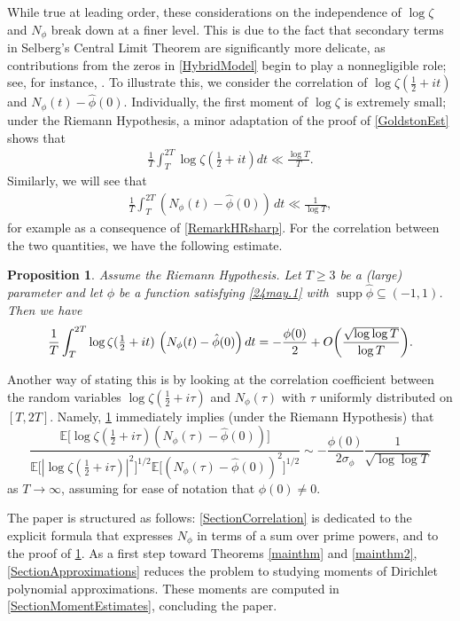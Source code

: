 \documentclass[12pt,oneside,english,a4paper]{amsart}
\newtheorem{prop}[thm]{Proposition}
\theoremstyle{remark}
\numberwithin{equation}{section}
\newcommand{\supp}{\operatorname{supp}}
\begin{document}
While true at leading order, these considerations on the independence of $\log\zeta$ and $N_\phi$ break down at a finer level. This is due to the fact that secondary terms in Selberg's Central Limit Theorem are significantly more delicate, as contributions from the zeros in \eqref{HybridModel} begin to play a nonnegligible role; see, for instance, \cite{Goldston1,LMQ,FG}.
To illustrate this, we consider the correlation of $\log\zeta(\frac12+it)$ and $N_\phi(t)-\hat\phi(0)$. Individually, the first moment of $\log\zeta$ is extremely small; under the Riemann Hypothesis, a minor adaptation of the proof of \eqref{GoldstonEst} shows that 
\begin{align*}
\frac{1}{T}\int_T^{2T} \log\zeta(\tfrac12+it)dt \ll \frac{\log T}{T}.
\end{align*}
Similarly, we will see that
\begin{align*} 
\frac{1}{T} \int_T^{2 T} \left (N_\phi(t) - \hat \phi(0) \right) \, dt \ll \frac{1}{\log T}, 
\end{align*}
for example as a consequence of \cref{RemarkHRsharp}.
For the correlation between the two quantities, we have the following estimate.

\begin{prop}\label{PropCorrelation}
    Assume the Riemann Hypothesis. Let $T \ge 3$ be a (large) parameter and let $\phi$ be a function satisfying \eqref{24may.1} with $\supp \hat\phi \subseteq (-1,1)$. Then we have
    \begin{equation}\notag
        \frac{1}{T}\int_{T}^{2T} \log \zeta(\tfrac{1}{2}+it) \, \left(N_\phi(t) - \hat\phi(0)\right) dt 
        = -\frac{\phi(0)}{2}+O\bigg(\frac{\sqrt{\log\log T}}{\log T}\bigg).
    \end{equation}
\end{prop}
Another way of stating this is by looking at the correlation coefficient between the random variables $\log \zeta(\tfrac{1}{2}+i \tau)$ and $N_\phi(\tau)$ with $\tau$ uniformly distributed on $[T,2T]$. Namely, \cref{PropCorrelation} immediately implies (under the Riemann Hypothesis) that
\[ \frac{\mathbb{E}\big[\log \zeta(\tfrac{1}{2}+i \tau) ( N_\phi(\tau) - \hat \phi(0) )\big]}{\mathbb{E}\big[ | \log \zeta(\tfrac{1}{2}+i \tau) |^2 \big]^{1/2} \mathbb{E} \big[( N_\phi(\tau) - \hat \phi(0) )^2\big]^{1/2}} \sim - \frac{\phi(0)}{2 \sigma_\phi } \frac{1}{\sqrt{\log \log T}} \]
as $T \to \infty$, assuming for ease of notation that $\phi (0) \ne 0$.

The paper is structured as follows: \cref{SectionCorrelation} is dedicated to the explicit formula that expresses $N_\phi$ in terms of a sum over prime powers, and to the proof of \cref{PropCorrelation}. As a first step toward Theorems \ref{mainthm} and \ref{mainthm2}, \cref{SectionApproximations} reduces the problem to studying moments of Dirichlet polynomial approximations. These moments are computed in \cref{SectionMomentEstimates}, concluding the paper.
\end{document}
